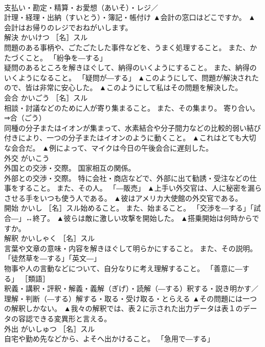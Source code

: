 \documentclass[8pt]{extreport}
\begin{document}
\begin{CJK}{UTF8}{min}
\\	支払い・勘定・精算・お愛想（あいそ）・レジ／
\\	計理・経理・出納（すいとう）・簿記・帳付け	▲会計の窓口はどこですか。 ▲会計はお帰りのレジでおねがいします。
\\	解決	かいけつ	［名］スル 
\\	問題のある事柄や、ごたごたした事件などを、うまく処理すること。 また、かたづくこと。 「紛争を―する」 
\\	疑問のあるところを解きほぐして、納得のいくようにすること。 また、納得のいくようになること。 「疑問が―する」	▲このようにして、問題が解決されたので、皆は非常に安心した。 ▲このようにして私はその問題を解決した。
\\	会合	かいごう	［名］スル 
\\	相談・討議などのために人が寄り集まること。 また、その集まり。 寄り合い。 
\\	⇒合（ごう） 
\\	同種の分子またはイオンが集まって、水素結合や分子間力などの比較的弱い結び付きにより、一つの分子またはイオンのように動くこと。	▲これはとても大切な会合だ。 ▲例によって、マイクは今日の午後会合に遅刻した。
\\	外交	がいこう	
\\	外国との交渉・交際。 国家相互の関係。 
\\	外部との交渉・交際。 特に会社・商店などで、外部に出て勧誘・受注などの仕事をすること。 また、その人。 「―販売」	▲上手い外交官は、人に秘密を漏らさせる手をいつも使う人である。 ▲彼はアメリカ大使館の外交官である。
\\	開始	かいし	［名］スル始めること。 また、始まること。 「交渉を―する」「試合―」↔終了。	▲彼らは敵に激しい攻撃を開始した。 ▲搭乗開始は何時からですか。
\\	解釈	かいしゃく	［名］スル 
\\	言葉や文章の意味・内容を解きほぐして明らかにすること。 また、その説明。 「徒然草を―する」「英文―」 
\\	物事や人の言動などについて、自分なりに考え理解すること。 「善意に―する」 ［類語］
\\	釈義・講釈・評釈・解義・義解（ぎげ）・読解（―する）釈する・説き明かす／
\\	理解・判断（―する）解する・取る・受け取る・とらえる	▲その問題には一つの解釈しかない。 ▲我々の解釈では、表２に示された出力データは表１のデータの容認できる変異形と言える。
\\	外出	がいしゅつ	［名］スル 
\\	自宅や勤め先などから、よそへ出かけること。 「急用で―する」 

\end{CJK}
\end{document}
